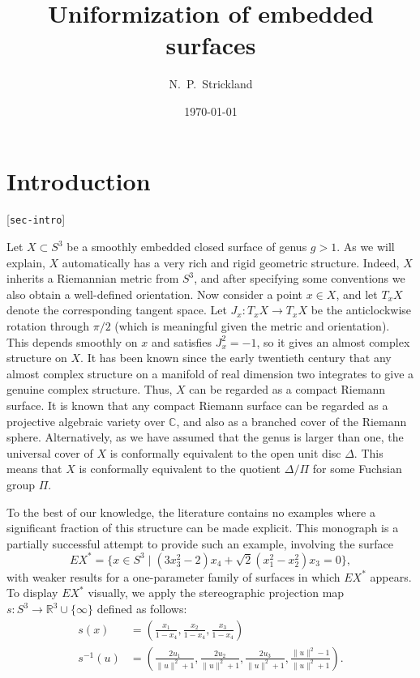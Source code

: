 \documentclass[reqno]{amsart}
\newcommand{\lbl}[1]{\label{#1}\textup{[\texttt{#1}]}\par}
\newcommand{\lbl}{\label}
\newcommand{\Dl}        {\Delta}
\newcommand{\R}         {{\mathbb{R}}}
\newcommand{\C}         {{\mathbb{C}}}
\newcommand{\st}        {\;|\;}
\newcommand{\rt}        {\sqrt{2}}
\renewcommand{\:}{\colon}
\theoremstyle{definition}
\begin{document}
\title{Uniformization of embedded surfaces}
\author{N.~P.~Strickland}
\date{\today}


\maketitle
\tableofcontents

\section{Introduction}
\lbl{sec-intro}

Let $X\subset S^3$ be a smoothly embedded closed surface of genus
$g>1$.  As we will explain, $X$ automatically has a very rich and
rigid geometric structure.  Indeed, $X$ inherits a Riemannian metric
from $S^3$, and after specifying some conventions we also obtain a
well-defined orientation.  Now consider a point $x\in X$, and let
$T_xX$ denote the corresponding tangent space.  Let $J_x\:T_xX\to
T_xX$ be the anticlockwise rotation through $\pi/2$ (which is
meaningful given the metric and orientation).  This depends smoothly
on $x$ and satisfies $J_x^2=-1$, so it gives an almost complex
structure on $X$.  It has been known since the early twentieth century
that any almost complex structure on a manifold of real dimension two
integrates to give a genuine complex structure.  Thus, $X$ can be
regarded as a compact Riemann surface.  It is known that any compact
Riemann surface can be regarded as a projective algebraic variety over
$\C$, and also as a branched cover of the Riemann sphere.
Alternatively, as we have assumed that the genus is larger than one,
the universal cover of $X$ is conformally equivalent to the open unit
disc $\Dl$.  This means that $X$ is conformally equivalent to the
quotient $\Dl/\Pi$ for some Fuchsian group $\Pi$.

To the best of our knowledge, the literature contains no examples
where a significant fraction of this structure can be made explicit.
This monograph is a partially successful attempt to provide such
an example, involving the surface
\[ EX^* = \{x\in S^3\st
              (3x_3^2-2)x_4+\rt(x_1^2-x_2^2)x_3=0
         \},
\]
with weaker results for a one-parameter family of surfaces in which
$EX^*$ appears.  To display $EX^*$ visually, we apply the
stereographic projection map $s\:S^3\to\R^3\cup\{\infty\}$ defined as
follows:
\begin{align*}
 s(x) &=
  \left(\frac{x_1}{1-x_4},\frac{x_2}{1-x_4},\frac{x_3}{1-x_4}\right)
  \\
 s^{-1}(u) &=
  \left(\frac{2u_1}{\|u\|^2+1},
        \frac{2u_2}{\|u\|^2+1},
        \frac{2u_3}{\|u\|^2+1},
        \frac{\|u\|^2-1}{\|u\|^2+1}\right).
\end{align*}
\end{document}
